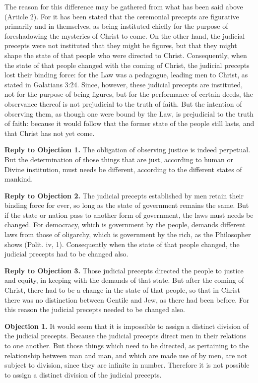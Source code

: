The reason for this difference may be gathered from what has been said above (Article 2). For it has been stated that the ceremonial precepts are figurative primarily and in themselves, as being instituted chiefly for the purpose of foreshadowing the mysteries of Christ to come. On the other hand, the judicial precepts were not instituted that they might be figures, but that they might shape the state of that people who were directed to Christ. Consequently, when the state of that people changed with the coming of Christ, the judicial precepts lost their binding force: for the Law was a pedagogue, leading men to Christ, as stated in Galatians 3:24. Since, however, these judicial precepts are instituted, not for the purpose of being figures, but for the performance of certain deeds, the observance thereof is not prejudicial to the truth of faith. But the intention of observing them, as though one were bound by the Law, is prejudicial to the truth of faith: because it would follow that the former state of the people still lasts, and that Christ has not yet come.

\textbf{Reply to Objection 1.} The obligation of observing justice is indeed perpetual. But the determination of those things that are just, according to human or Divine institution, must needs be different, according to the different states of mankind.

\textbf{Reply to Objection 2.} The judicial precepts established by men retain their binding force for ever, so long as the state of government remains the same. But if the state or nation pass to another form of government, the laws must needs be changed. For democracy, which is government by the people, demands different laws from those of oligarchy, which is government by the rich, as the Philosopher shows (Polit. iv, 1). Consequently when the state of that people changed, the judicial precepts had to be changed also.

\textbf{Reply to Objection 3.} Those judicial precepts directed the people to justice and equity, in keeping with the demands of that state. But after the coming of Christ, there had to be a change in the state of that people, so that in Christ there was no distinction between Gentile and Jew, as there had been before. For this reason the judicial precepts needed to be changed also.


\textbf{Objection 1.} It would seem that it is impossible to assign a distinct division of the judicial precepts. Because the judicial precepts direct men in their relations to one another. But those things which need to be directed, as pertaining to the relationship between man and man, and which are made use of by men, are not subject to division, since they are infinite in number. Therefore it is not possible to assign a distinct division of the judicial precepts.

